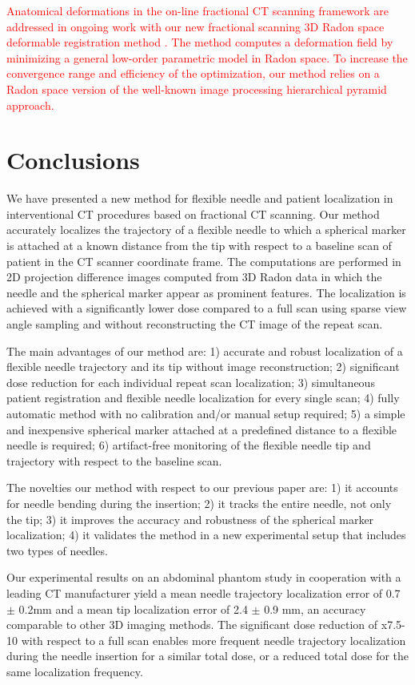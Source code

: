 \textcolor{red}{Anatomical deformations in the on-line fractional CT scanning framework are addressed in ongoing work with our new fractional scanning 3D Radon space deformable registration method \cite{adelmanmsc2018}. The method computes a deformation field by minimizing a general low-order parametric model in Radon space.  To increase the convergence range and efficiency of the optimization, our method relies on a Radon space version of the well-known image processing hierarchical pyramid approach.}
 
\section*{Conclusions}
We have presented a new method for flexible needle and patient localization in interventional CT procedures based on fractional CT scanning.
Our method accurately localizes the trajectory of a flexible needle to which a spherical marker is attached at a known distance from the tip with respect to a baseline scan of patient in the CT scanner coordinate frame. The computations are performed in 2D projection difference images computed from 3D Radon data in which the needle and the spherical marker appear as prominent features. 
The localization is achieved with a significantly lower dose compared to a full scan using sparse view angle sampling and without reconstructing the CT image of the repeat scan.

The main advantages of our method are:
1) accurate and robust localization of a flexible needle trajectory and its tip without image reconstruction;
2) significant dose reduction for each individual repeat scan localization;
3) simultaneous patient registration and flexible needle localization for every single scan; 
4) fully automatic method with no calibration and/or manual setup required; 
5) a simple and inexpensive spherical marker attached at a predefined distance to a flexible needle is required; 
6) artifact-free monitoring of the flexible needle tip and trajectory with respect to the baseline scan.

The novelties our method with respect to our previous paper are: 1) it accounts for needle bending during the insertion; 2) it tracks the entire needle, not only the tip; 3) it improves the accuracy and robustness of the spherical marker localization; 4) it validates the method in a new experimental setup that includes two types of needles. 

Our experimental results on an abdominal phantom study
in cooperation with a leading CT manufacturer yield a mean needle trajectory localization error of 0.7 $\pm$ 0.2mm and a mean tip localization error of 2.4 $\pm$ 0.9 mm, an accuracy comparable to other 3D imaging methods. The significant dose reduction of x7.5-10 with respect to a full scan enables more frequent needle trajectory localization during the needle insertion for a similar total dose, or a reduced total dose for the same localization frequency.

